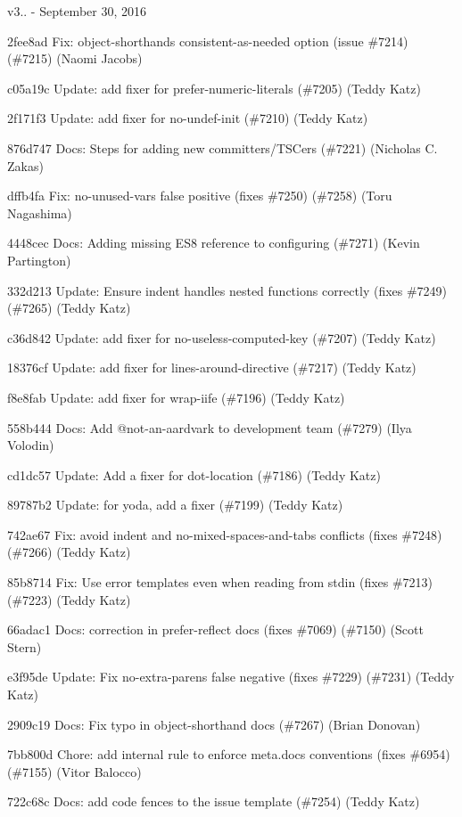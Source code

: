 v3.. -\/ September 30, 2016


\begin{DoxyItemize}
\item 2fee8ad Fix\+: object-\/shorthand\textquotesingle{}s consistent-\/as-\/needed option (issue \#7214) (\#7215) (Naomi Jacobs)
\item c05a19c Update\+: add fixer for {\ttfamily prefer-\/numeric-\/literals} (\#7205) (Teddy Katz)
\item 2f171f3 Update\+: add fixer for {\ttfamily no-\/undef-\/init} (\#7210) (Teddy Katz)
\item 876d747 Docs\+: Steps for adding new committers/\+T\+S\+Cers (\#7221) (Nicholas C. Zakas)
\item dffb4fa Fix\+: {\ttfamily no-\/unused-\/vars} false positive (fixes \#7250) (\#7258) (Toru Nagashima)
\item 4448cec Docs\+: Adding missing E\+S8 reference to configuring (\#7271) (Kevin Partington)
\item 332d213 Update\+: Ensure {\ttfamily indent} handles nested functions correctly (fixes \#7249) (\#7265) (Teddy Katz)
\item c36d842 Update\+: add fixer for {\ttfamily no-\/useless-\/computed-\/key} (\#7207) (Teddy Katz)
\item 18376cf Update\+: add fixer for {\ttfamily lines-\/around-\/directive} (\#7217) (Teddy Katz)
\item f8e8fab Update\+: add fixer for {\ttfamily wrap-\/iife} (\#7196) (Teddy Katz)
\item 558b444 Docs\+: Add @not-\/an-\/aardvark to development team (\#7279) (Ilya Volodin)
\item cd1dc57 Update\+: Add a fixer for {\ttfamily dot-\/location} (\#7186) (Teddy Katz)
\item 89787b2 Update\+: for {\ttfamily yoda}, add a fixer (\#7199) (Teddy Katz)
\item 742ae67 Fix\+: avoid indent and no-\/mixed-\/spaces-\/and-\/tabs conflicts (fixes \#7248) (\#7266) (Teddy Katz)
\item 85b8714 Fix\+: Use error templates even when reading from stdin (fixes \#7213) (\#7223) (Teddy Katz)
\item 66adac1 Docs\+: correction in prefer-\/reflect docs (fixes \#7069) (\#7150) (Scott Stern)
\item e3f95de Update\+: Fix {\ttfamily no-\/extra-\/parens} false negative (fixes \#7229) (\#7231) (Teddy Katz)
\item 2909c19 Docs\+: Fix typo in object-\/shorthand docs (\#7267) (Brian Donovan)
\item 7bb800d Chore\+: add internal rule to enforce meta.\+docs conventions (fixes \#6954) (\#7155) (Vitor Balocco)
\item 722c68c Docs\+: add code fences to the issue template (\#7254) (Teddy Katz)
\end{DoxyItemize}

